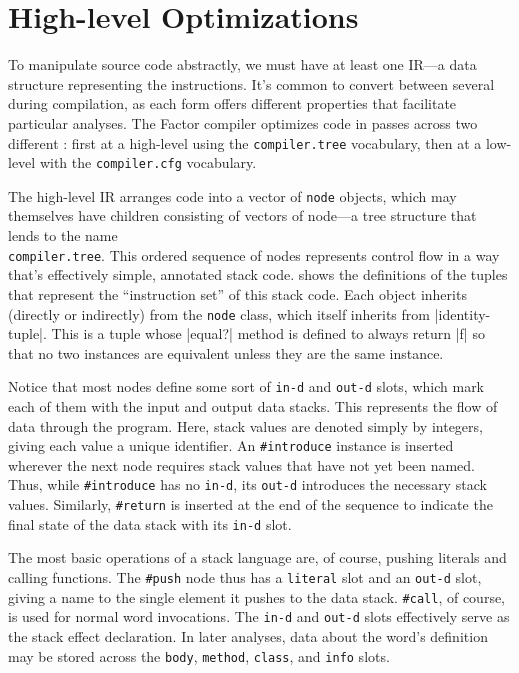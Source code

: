 \section{High-level Optimizations}\label{sec:compiler:tree}

To manipulate source code abstractly, we must have at least one \gls{IR}---a
data structure representing the instructions.  It's common to convert between
several  during compilation, as each form offers different
properties that facilitate particular analyses.  The Factor compiler optimizes
code in passes across two different : first at a high-level using
the \Verb|compiler.tree| vocabulary, then at a low-level with the
\Verb|compiler.cfg| vocabulary.


The high-level \gls{IR} arranges code into a vector of \Verb|node| objects,
which may themselves have children consisting of vectors of node---a tree
structure that lends to the name\\\Verb|compiler.tree|.  This ordered sequence
of nodes represents control flow in a way that's effectively simple, annotated
stack code.   shows the definitions of the tuples that represent
the ``instruction set'' of this stack code.  Each object inherits (directly or
indirectly) from the \Verb|node| class, which itself inherits from
\factor|identity-tuple|.  This is a tuple whose \factor|equal?| method is
defined to always return \factor|f| so that no two instances are equivalent
unless they are the same instance.

Notice that most nodes define some sort of \Verb|in-d| and \Verb|out-d|
slots, which mark each of them with the input and output data stacks.  This
represents the flow of data through the program.  Here, stack values are
denoted simply by integers, giving each value a unique identifier.  An
\Verb|#introduce| instance is inserted wherever the next node requires stack
values that have not yet been named.  Thus, while \Verb|#introduce| has no
\Verb|in-d|, its \Verb|out-d| introduces the necessary stack values.
Similarly, \Verb|#return| is inserted at the end of the sequence to indicate
the final state of the data stack with its \Verb|in-d| slot.

The most basic operations of a stack language are, of course, pushing literals
and calling functions.  The \Verb|#push| node thus has a \Verb|literal|
slot and an \Verb|out-d| slot, giving a name to the single element it pushes
to the data stack.  \Verb|#call|, of course, is used for normal word
invocations.  The \Verb|in-d| and \Verb|out-d| slots effectively serve as
the stack effect declaration.  In later analyses, data about the word's
definition may be stored across the \Verb|body|, \Verb|method|,
\Verb|class|, and \Verb|info| slots.

